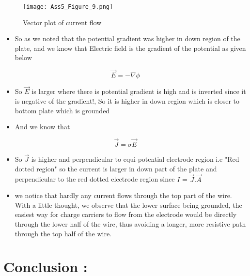 \documentclass[11pt, a4paper]{article}
\begin{document}
  \begin{figure}[!tbh]
   \centering
   \texttt{[image: Ass5\_Figure\_9.png]}  
   \caption{Vector plot of current flow}
  \end{figure}
  

  \begin{itemize}
  \item
    So as we noted that the potential gradient was higher in down region
    of the plate, and we know that Electric field is the gradient of the
    potential as given below
  \end{itemize}
  
  \begin{equation}
  \vec{E} = -\nabla{\phi}
     \end{equation}
  
  \begin{itemize}
  \item
    So \(\vec{E}\) is larger where there is potential gradient is high and
    is inverted since it is negative of the gradient!, So it is higher in
    down region which is closer to bottom plate which is grounded
  \item
    And we know that
  \end{itemize}
  
  \begin{equation}
  \vec{J} = \sigma\vec{E}
     \end{equation}
  
  \begin{itemize}
  \item
    So \(\vec{J}\) is higher and perpendicular to equi-potential electrode
    region i.e "Red dotted region" so the current is larger in down part
    of the plate and perpendicular to the red dotted electrode region
    since \(I\) = \(\vec{J}.\vec{A}\)
  \item
   	we notice that hardly any current flows through  the  top  part  of  the  wire.   With  a  little  thought,  we  observe  that the lower surface being grounded, the easiest way for charge carriers to flow from the electrode would be directly through the lower half of the wire, thus avoiding a longer, more resistive path through the top half of the wire.
  \end{itemize}
  
    
  
    
      
  \section{Conclusion :}
  
\end{document}
